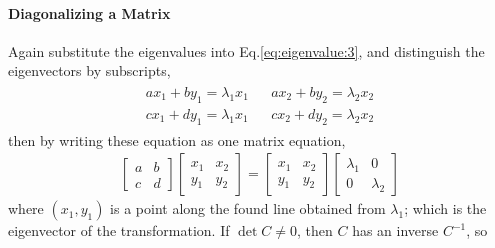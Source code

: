             \paragraph{Diagonalizing a Matrix} %
            \label{par:Diagonalizing a Matrix}
            Again substitute the eigenvalues into Eq.\eqref{eq:eigenvalue:3}, and distinguish the eigenvectors by subscripts, 
            \begin{align}
                \label{eq:diagonalizing a matrix:1}
                \begin{aligned}
                    a x_1 + b y_1 = \lambda_1 x_1 && a x_2 + b y_2 = \lambda_2 x_2 \\
                    c x_1 + d y_1 = \lambda_1 x_1 && c x_2 + d y_2 = \lambda_2 x_2
                \end{aligned}
            \end{align}
            then by writing these equation as one matrix equation, 
            \begin{align}
                \label{eq:diagonalizing a matrix:2}
                \begin{bmatrix}
                    a & b \\ c & d
                \end{bmatrix} \begin{bmatrix}
                    x_1 & x_2 \\
                    y_1 & y_2
                \end{bmatrix} = \begin{bmatrix}
                    x_1 & x_2 \\
                    y_1 & y_2
                \end{bmatrix} \begin{bmatrix}
                    \lambda_1 & 0  \\ 0 & \lambda_2
                \end{bmatrix}
            \end{align}
            where $(x_1, y_1)$ is a point along the found line obtained from $\lambda_1$; which is the eigenvector of the transformation. If $\det{C} \neq 0$, then $C$ 
            has an inverse $C^{-1}$, so 

